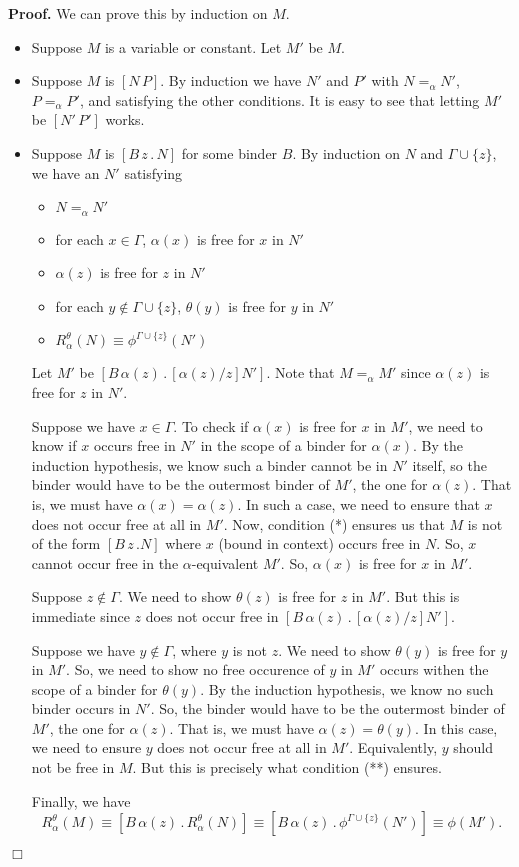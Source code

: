{\bf Proof.}
We can prove this by induction on $M$.
\begin{itemize}
\item Suppose $M$ is a variable or constant.  Let $M'$ be $M$.
\item Suppose $M$ is $[N\, P]$.  By induction we have $N'$ and $P'$
with $N =_\alpha N'$, $P =_\alpha P'$, and satisfying the other conditions.
It is easy to see that letting $M'$ be $[N'\, P']$ works.
\item Suppose $M$ is $[B\, z \, .\, N]$ for some binder $B$.
By induction on $N$ and $\Gamma\cup \{z\}$, we have an $N'$
satisfying
\begin{itemize}
\item $N =_\alpha N'$
\item for each $x\in\Gamma$, $\alpha(x)$ is free for $x$ in $N'$
\item $\alpha(z)$ is free for $z$ in $N'$
\item for each $y\not\in\Gamma\cup\{z\}$, $\theta(y)$ is free for $y$ in $N'$
\item $R^\theta_\alpha(N) \equiv \phi^{\Gamma\cup\{z\}}(N')$
\end{itemize}
Let $M'$ be $[B\, \alpha(z) \, . \, [\alpha(z)/z]N']$.
Note that $M =_\alpha M'$ since $\alpha(z)$ is free for $z$ in $N'$.

Suppose we have $x\in\Gamma$.  To check if $\alpha(x)$ is free for $x$ in $M'$,
we need to know if $x$ occurs free in $N'$ in the scope of a binder for $\alpha(x)$.
By the induction hypothesis, we know such a binder cannot be in $N'$ itself,
so the binder would have to be the outermost binder of $M'$, the one for $\alpha(z)$.
That is, we must have $\alpha(x) = \alpha(z)$.  In such a case, we need
to ensure that $x$ does not occur free at all in $M'$.
Now, condition (*) ensures us that $M$ is not of the form $[B\, z\, . N]$
where $x$ (bound in context) occurs free in $N$.  So, $x$ cannot occur free in
the $\alpha$-equivalent $M'$.
So, $\alpha(x)$ is free for $x$ in $M'$.

Suppose $z\not\in\Gamma$.  We need to show $\theta(z)$ is free for $z$ in $M'$.
But this is immediate since $z$ does not occur free in
$[B\, \alpha(z) \, . \, [\alpha(z)/z]N']$. 

Suppose we have $y\not\in\Gamma$, where $y$ is not $z$.
We need to show $\theta(y)$ is free for $y$ in $M'$.
So, we need to show no free occurence of $y$ in $M'$ occurs
withen the scope of a binder for $\theta(y)$.  By the induction
hypothesis, we know no such binder occurs in $N'$.
So, the binder would have to be the outermost binder of $M'$, 
the one for $\alpha(z)$.  That is, we must have $\alpha(z)=\theta(y)$.
In this case, we need to ensure $y$ does not occur free at all in $M'$.
Equivalently, $y$ should not be free in $M$.  But this is precisely what
condition (**) ensures.

Finally, we have
$$R^\theta_\alpha(M) \equiv [B \, \alpha(z) \, . \, R^\theta_\alpha(N)]
\equiv [B \, \alpha(z) \, . \, \phi^{\Gamma\cup\{z\}}(N')]
\equiv \phi(M').$$
\end{itemize}
$\Box$

